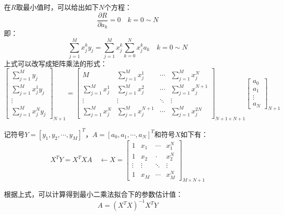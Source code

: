 在$R$取最小值时，可以给出如下$N$个方程：
\begin{equation}
    \frac{\partial R}{\partial a_k} = 0 \quad k=0\sim N
\end{equation}
即：
\begin{equation}
    \sum_{j=1}^M x_{j}^k y_j = \sum_{j=1}^M x_j^k \sum_{k=0}^N x_j^k a_k\quad k=0\sim N
\end{equation}
上式可以改写成矩阵乘法的形式：
\begin{equation}
    \begin{bmatrix}
        \sum_{j=1}^M  y_j\\
        \sum_{j=1}^M x_{j}^1 y_j\\
        \vdots\\
        \sum_{j=1}^M x_{j}^N y_j
    \end{bmatrix}_{N+1}
    =
    \begin{bmatrix}
        M & \sum_{j=1}^M x_{j}^1 & \cdots & \sum_{j=1}^M x_{j}^N \\
        \sum_{j=1}^M x_{j}^1 & \sum_{j=1}^M x_{j}^2 & \cdots & \sum_{j=1}^M x_{j}^{N+1} \\
        \vdots & \vdots & \ddots & \vdots \\
        \sum_{j=1}^M x_{j}^{N} & \sum_{j=1}^M x_{j}^{N+1} & \cdots & \sum_{j=1}^M x_{j}^{2N}
    \end{bmatrix}_{N+1\times N+1}
    \begin{bmatrix}
        a_0 \\ a_1 \\ \vdots \\ a_N
    \end{bmatrix}_{N+1}
\end{equation}

记符号$Y=[y_1, y_2,\cdots,y_M]^T$，$A=[a_0,a_1,\cdots,a_N]^T$和符号$X$如下有：
\begin{equation}
    X^T Y = X^T X A \quad \leftarrow 
    X=
    \begin{bmatrix}
        1 & x_1 & \cdots & x_1^N\\
        1 & x_2 & \cdot & x_2^N \\
        \vdots & \vdots & \ddots & \vdots \\
        1 & x_M & \cdots & x_M^N
    \end{bmatrix}_{M\times N+1}
\end{equation}

根据上式，可以计算得到最小二乘法拟合下的参数估计值：
\begin{equation}
    \label{最小二乘法}
    A = (X^T X)^{-1} X^T Y
\end{equation}

